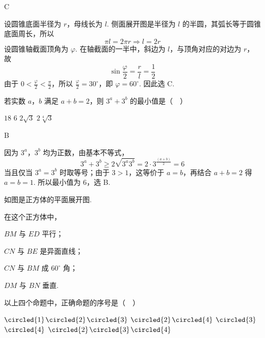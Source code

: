 \begin{answer}
C
\end{answer}

\begin{solution}
设圆锥底面半径为 \(r\)，母线长为 \(l\). 侧面展开图是半径为 \(l\) 的半圆，其弧长等于圆锥底面周长，所以
\[
\pi l=2\pi r\Longrightarrow l=2r
\]
设圆锥轴截面顶角为 \(\varphi\). 在轴截面的一半中，斜边为 \(l\)，与顶角对应的对边为 \(r\)，故
\[
\sin\frac\varphi2=\frac rl=\frac12
\]
由于 \(0<\frac\varphi2<\frac\pi2\)，所以 \(\frac\varphi2=30^\circ\)，即 \(\varphi=60^\circ\). 因此选 C.
\end{solution}

\begin{problem}
若实数 \(a\)，\(b\) 满足 \(a + b = 2\)，则 \(3^a + 3^b\) 的最小值是（\(\quad\)）

\choices
    {\(18\)}
    {\(6\)}
    {\(2\sqrt{3}\)}
    {\(2\sqrt[4]{3}\)}
\end{problem}

\begin{answer}
B
\end{answer}

\begin{solution}
因为 \(3^a\)，\(3^b\) 均为正数，由基本不等式，
\[
3^a+3^b\geqslant2\sqrt{3^a3^b}=2\cdot3^{\frac{(a+b)}{2}}=6
\]
当且仅当 \(3^a=3^b\) 时取等号；由于 \(3>1\)，这等价于 \(a=b\)，再结合 \(a+b=2\) 得 \(a=b=1\). 所以最小值为 \(6\)，选 B.
\end{solution}

\begin{problem}
如图是正方体的平面展开图.

在这个正方体中，
\begin{circlelist}
\item \(BM\) 与 \(ED\) 平行；
\item \(CN\) 与 \(BE\) 是异面直线；
\item \(CN\) 与 \(BM\) 成 \(60^{\circ}\) 角；
\item \(DM\) 与 \(BN\) 垂直.
\end{circlelist}
以上四个命题中，正确命题的序号是（\(\quad\)）

\problemresetlayout
{}

\choices
    {\(\circled{1}\)\(\circled{2}\)\(\circled{3}\)}
    {\(\circled{2}\)\(\circled{4}\)}
    {\(\circled{3}\)\(\circled{4}\)}
    {\(\circled{2}\)\(\circled{3}\)\(\circled{4}\)}
\end{problem}

